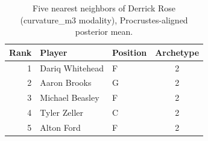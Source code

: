 \begin{table}[htbp]
  \centering\small
  \begin{tabular}{rllc}
    \toprule
    Rank & Player & Position & Archetype \\
    \midrule
    1 & Dariq Whitehead & F & 2 \\
    2 & Aaron Brooks & G & 2 \\
    3 & Michael Beasley & F & 2 \\
    4 & Tyler Zeller & C & 2 \\
    5 & Alton Ford & F & 2 \\
    \bottomrule
  \end{tabular}
  \caption{Five nearest neighbors of Derrick Rose (curvature_m3 modality), Procrustes-aligned posterior mean.}
  \label{tab:Derrick_Rose_neighbors_curvature_m3}
\end{table}

